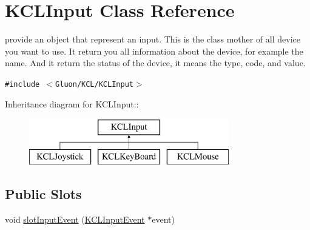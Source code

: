 \hypertarget{class_k_c_l_input}{
\section{KCLInput Class Reference}
\label{class_k_c_l_input}
}
provide an object that represent an input. This is the class mother of all device you want to use. It return you all information about the device, for example the name. And it return the status of the device, it means the type, code, and value.  


{\tt \#include $<$Gluon/KCL/KCLInput$>$}

Inheritance diagram for KCLInput::\begin{figure}[H]
\begin{center}
\leavevmode
\includegraphics[height=2cm]{class_k_c_l_input}
\end{center}
\end{figure}
\subsection*{Public Slots}
\begin{CompactItemize}
\item 
void \hyperlink{class_k_c_l_input_09e6f283721d38bb9aa2a703d6a735c6}{slotInputEvent} (\hyperlink{class_k_c_l_input_event}{KCLInputEvent} $\ast$event)
\end{CompactItemize}
